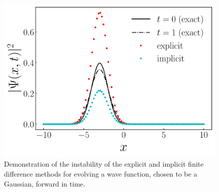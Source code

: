 \begin{figure}[tb]
    \centering
    \includegraphics[width=0.7\linewidth]{finite_differences-evolution.pdf}
    \caption{Demonstration of the instability of the explicit and implicit finite difference methods for evolving a wave function, chosen to be a Gaussian, forward in time.}
    \label{fig:finite-differences-evolution}
\end{figure}


